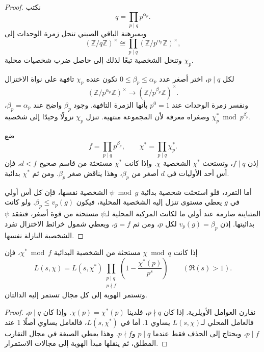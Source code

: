 \begin{proof}
نكتب
\[
q=\prod_{p\mid q}p^{\alpha_p}.
\]
وبمبرهنة الباقي الصيني تنحل زمرة الوحدات إلى
\[
(\mathbb Z/q\mathbb Z)^{\times}
\cong
\prod_{p\mid q}(\mathbb Z/p^{\alpha_p}\mathbb Z)^{\times},
\]
وتنحل الشخصية تبعًا لذلك إلى حاصل ضرب شخصيات محلية \(\chi_p\).

لكل \(p\mid q\)، اختر أصغر عدد
\(0\leq\beta_p\leq\alpha_p\) تكون عنده \(\chi_p\) تافهة على نواة
الاختزال
\[
(\mathbb Z/p^{\alpha_p}\mathbb Z)^{\times}
\longrightarrow
(\mathbb Z/p^{\beta_p}\mathbb Z)^{\times}.
\]
ونفسر زمرة الوحدات عند \(p^0=1\) بأنها الزمرة التافهة. وجود
\(\beta_p\) واضح عند \(\beta_p=\alpha_p\)، وصغراه معرفة لأن المجموعة
منتهية. تنزل \(\chi_p\) نزولًا وحيدًا إلى شخصية
\(\chi_p^{*}\bmod p^{\beta_p}\).

ضع
\[
f=\prod_{p\mid q}p^{\beta_p},
\qquad
\chi^{*}=\prod_{p\mid q}\chi_p^{*}.
\]
إذن \(f\mid q\)، وتستحث \(\chi^{*}\) الشخصية \(\chi\). وإذا كانت
\(\chi^{*}\) مستحثة من قاسم صحيح \(d<f\)، فإن أس أحد الأوليات في
\(d\) أصغر من \(\beta_p\)، وهذا يناقض صغر \(\beta_p\). ومن ثم
\(\chi^{*}\) بدائية.

أما التفرد، فلو استحثت شخصية بدائية \(\psi\bmod g\) الشخصية نفسها، فإن
كل أس أولي في \(g\) يعطي مستوى تنزل إليه الشخصية المحلية، فيكون
\(\beta_p\leq v_p(g)\). ولو كانت المتباينة صارمة عند أولي ما لكانت
المركبة المحلية لـ\(\psi\) مستحثة من قوة أصغر، فتفقد \(\psi\)
بدائيتها. إذن \(v_p(g)=\beta_p\) لكل \(p\)، ومن ثم \(g=f\)، ويعطي
شمول خرائط الاختزال تفرد الشخصية النازلة نفسها.
\end{proof}

\begin{proposition}
\label{prop:induced-l-factorization}
\provedhere
إذا كانت \(\chi\bmod q\) مستحثة من الشخصية البدائية
\(\chi^{*}\bmod f\)، فإن
\[
L(s,\chi)
=
L(s,\chi^{*})
\prod_{\substack{p\mid q\\p\nmid f}}
\left(1-\frac{\chi^{*}(p)}{p^s}\right)
\qquad(\Re(s)>1).
\]
وتستمر الهوية إلى كل مجال تستمر إليه الدالتان.
\end{proposition}

\begin{proof}
نقارن العوامل الأويلرية. إذا كان \(p\nmid q\)، فلدينا
\(\chi(p)=\chi^{*}(p)\). وإذا كان \(p\mid q\)، فالعامل المحلي
لـ\(L(s,\chi)\) يساوي \(1\). أما في \(L(s,\chi^{*})\)، فالعامل
يساوي أصلًا \(1\) عند \(p\mid f\)، ويحتاج إلى الحذف فقط عندما
\(p\mid q\) و\(p\nmid f\). وهذا يعطي الصيغة في مجال التقارب المطلق،
ثم ينقلها مبدأ الهوية إلى مجالات الاستمرار.
\end{proof}

